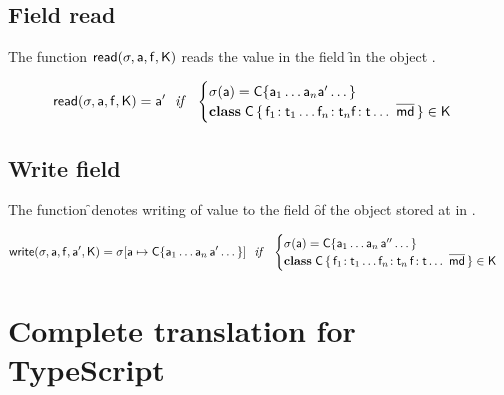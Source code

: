 \documentclass[a4paper,USenglish]{tex/lipics-v2016}
\begin{document}
\subsection{Field read}

The function ${\sf{read}}(\sigma,{\sf{a}},{\sf{f}},{\sf{K}})$ reads the value in the field \f in the object \a.

\begin{equation*}
\readf \s\a\f\K = \ap 
  ~~\mathit{if}~~ \begin{cases}  \s(\a) = \obj\C{\a_1\dots\a_n \ap \dots}\\
 \Class\C {\Fdef{\f_1}{\t_1}\dots\Fdef{\f_n}{\t_n}\Ftype\f\t\dots}{\b\md}\in\K
 \end{cases}
\end{equation*}

\subsection{Write field}

The function \setf\s\a\f\ap\K denotes writing of value \ap to the field \f of
the object stored at \a in \s.

\begin{equation*}
\setf \s\a\f\ap\K= \Map\s{\Bind{\a}{\obj\C{\a_1\dots\a_n\,\ap\dots}}}
  ~~\mathit{if}~~ \begin{cases}
   \s(\a) = \obj\C{\a_1\dots\a_n\,\app\dots}\\
   \Class\C{\Fdef{\f_1}{\t_1}\dots\Fdef{\f_n}{\t_n}\,\Fdef\f\t\dots}{\b\md}\in\K
\end{cases}
\end{equation*}

% 
% 
% 


\section{Complete translation for TypeScript}
\end{document}
